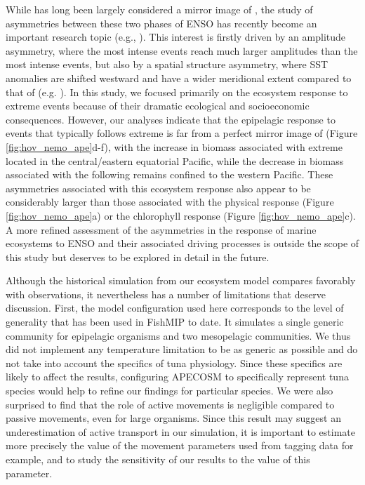 While \nina{} has long been largely considered a mirror image of \nino{}, the study of asymmetries between these two phases of ENSO has recently become an important research topic (e.g., \citealt{anENSOIrregularityAsymmetry2020}). This interest is firstly driven by an amplitude asymmetry, where the most intense \nino{} events reach much larger amplitudes than the most intense \nina{} events, but also by a spatial structure asymmetry, where \nina{} SST anomalies are shifted westward and have a wider meridional extent compared to that of \nino{} (e.g. \citealt{takahashiENSORegimesReinterpreting2011}). In this study, we focused primarily on the ecosystem response to extreme \nino{} events because of their dramatic ecological and socioeconomic consequences. However, our analyses indicate that the epipelagic response to \nina{} events that typically follows extreme \nino{} is far from a perfect mirror image of \nino{} (Figure \ref{fig:hov_nemo_ape}d-f), with the increase in biomass associated with extreme \nino{} located in the central/eastern equatorial Pacific, while the decrease in biomass associated with the following \nina{} remains confined to the western Pacific. These asymmetries associated with this ecosystem response also appear to be considerably larger than those associated with the physical response (Figure \ref{fig:hov_nemo_ape}a) or the chlorophyll response (Figure \ref{fig:hov_nemo_ape}c). A more refined assessment of the asymmetries in the response of marine ecosystems to ENSO and their associated driving processes is outside the scope of this study but deserves to be explored in detail in the future.

Although the historical simulation from our ecosystem model compares favorably with observations, it nevertheless has a number of limitations that deserve discussion. First, the model configuration used here corresponds to the level of generality that has been used in FishMIP to date. It simulates a single generic community for epipelagic organisms and two mesopelagic communities. We thus did not implement any temperature limitation to be as generic as possible and do not take into account the specifics of tuna physiology. Since these specifics are likely to affect the results, configuring APECOSM to specifically represent tuna species would help to refine our findings for particular species. We were also surprised to find that the role of active movements is negligible compared to passive movements, even for large organisms. Since this result may suggest an underestimation of active transport in our simulation, it is important to estimate more precisely the value of the movement parameters used from tagging data for example, and to study the sensitivity of our results to the value of this parameter.

